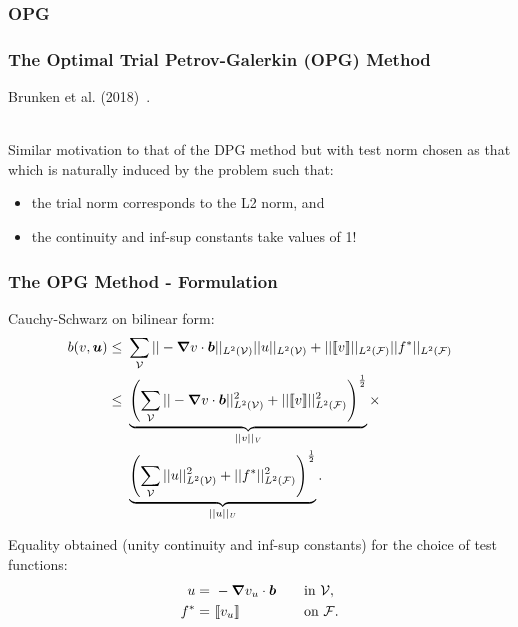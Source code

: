 \subsubsection{OPG}

\begin{frame}
\frametitle{The Optimal Trial Petrov-Galerkin (OPG) Method}

Brunken et al. (2018)~\cite{Demkowicz2011}.
\\~

Similar motivation to that of the DPG method but with test norm
chosen as that which is naturally induced by the problem such that:
\begin{itemize}
\item the trial norm corresponds to the L2 norm, and
\item the continuity and inf-sup constants take values of 1!
\end{itemize}

\end{frame}

\begin{frame}
\frametitle{The OPG Method - Formulation}

Cauchy-Schwarz on bilinear form:
\begin{align} \label{eq:cauchy_scwarz_advection}
b(v,\varg{u})
\le\ & \sum_{\fe{V}}
|| - \nabla v \cdot \varv{b} ||_{L^2(\fe{V})} || u ||_{L^2(\fe{V})}
+
||\jump{v}||_{L^2(\fe{F})} ||f^*||_{L^2(\fe{F})} \\
\le\ &
\underbrace{\left(
\sum_{\fe{V}} || - \nabla v \cdot \varv{b} ||^2_{L^2(\fe{V})} + ||\jump{v}||^2_{L^2(\fe{F})}
\right)^\frac{1}{2}}_{||v||_\fspace{V}}
       \times \\
  &
\underbrace{\left(
\sum_{\fe{V}} || u ||^2_{L^2(\fe{V})} + ||f^*||^2_{L^2(\fe{F})}
\right)^\frac{1}{2}}_{||u||_\fspace{U}}.
\end{align}

Equality obtained (unity continuity and inf-sup constants) for the choice of
test functions:
\begin{alignat}{3}
u =\ & -\nabla v_u \cdot \vect{b}\quad && \text{in}\ \fe{V}, \\
f^* =\ & \jump{v_u} && \text{on}\ \fe{F}.
\end{alignat}

\end{frame}

